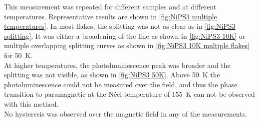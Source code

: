 \documentclass[
	oneside,
	parskip=half,
	a4paper,
]{scrbook}
\begin{document}
This measurement was repeated for different samples and at different temperatures.
Representative results are shown in \autoref{fig:NiPS3 multiple temperatures}.
In most flakes, the splitting was not as clear as in \autoref{fig:NiPS3 splitting}.
It was either a broadening of the line as shown in \autoref{fig:NiPS3 10K} or multiple overlapping splitting curves as shown in \autoref{fig:NiPS3 10K multiple flakes} for \SI{50}{K}.\\
At higher temperatures, the photoluminescence peak was broader and the splitting was not visible, as shown in \autoref{fig:NiPS3 50K}.
Above \SI{50}{K} the photoluminescence could not be measured over the field, and thus the phase transition to paramagnetic at the Néel temperature of \SI{155}{K} \cite{MPS_magnetism} can not be observed with this method.\\
No hysteresis was observed over the magnetic field in any of the measurements.

\clearpage
\end{document}

